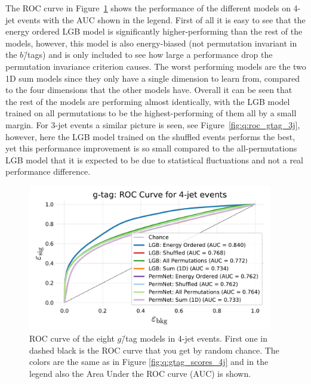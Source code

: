 The ROC curve in Figure~\ref{fig:q:roc_gtag_4j_non_appendix} shows the performance of the different models on 4-jet events with the AUC shown in the legend. First of all it is easy to see that the energy ordered LGB model is significantly higher-performing than the rest of the models, however, this model is also energy-biased (not permutation invariant in the $b$\=/tags) and is only included to see how large a performance drop the permutation invariance criterion causes. The worst performing models are the two 1D sum models since they only have a single dimension to learn from, compared to the four dimensions that the other models have. Overall it can be seen that the rest of the models are performing almost identically, with the LGB model trained on all permutations to be the highest-performing of them all by a small margin. 
For 3-jet events a similar picture is seen, see Figure~\ref{fig:q:roc_gtag_3j}, however, here the LGB model trained on the shuffled events performs the best, yet this performance improvement is so small compared to the all-permutations LGB model that it is expected to be due to statistical fluctuations and not a real performance difference. 

\begin{figure}[h!]
  \centerfloat
  \includegraphics[width=0.95\textwidth, trim=10 10 10 40, clip]{figures/quarks/gtag_ROC_4_jet-down_sample=1.00-ML_vars=vertex-selection=b-ejet_min=4-n_iter_RS_lgb=99-n_iter_RS_xgb=9-cdot_cut=0.90-version=19.pdf}
  \caption[ROC Curve for $g$\=/Tag in 4-Jet Events]
          {\label{fig:q:roc_gtag_4j_non_appendix}ROC curve of the eight $g$\=/tag models in 4-jet events. First one in dashed black is the ROC curve that you get by random chance. The colors are the same as in 
          Figure \ref{fig:q:gtag_scores_4j} 
          and in the legend also the Area Under the ROC curve (AUC) is shown.} 
\end{figure}

